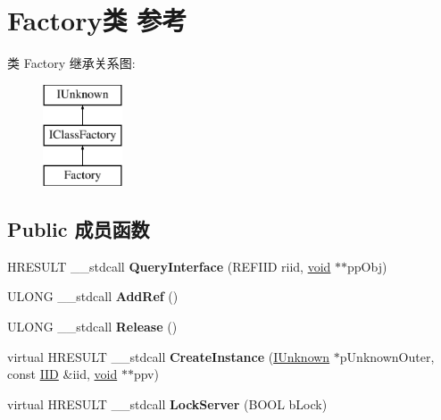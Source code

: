 \hypertarget{class_factory}{}\section{Factory类 参考}
\label{class_factory}
类 Factory 继承关系图\+:\begin{figure}[H]
\begin{center}
\leavevmode
\includegraphics[height=3.000000cm]{class_factory}
\end{center}
\end{figure}
\subsection*{Public 成员函数}
\begin{DoxyCompactItemize}
\item 
\mbox{\label{class_factory_a132826b7d9cfd08ceb73b3ae79027eee}} 
H\+R\+E\+S\+U\+LT \+\_\+\+\_\+stdcall {\bfseries Query\+Interface} (R\+E\+F\+I\+ID riid, \hyperlink{interfacevoid}{void} $\ast$$\ast$pp\+Obj)
\item 
\mbox{\label{class_factory_af89bb4550e9ac048f5c96f03cd5d4218}} 
U\+L\+O\+NG \+\_\+\+\_\+stdcall {\bfseries Add\+Ref} ()
\item 
\mbox{\label{class_factory_ac11f48570ae0a77bb49965536f341fa9}} 
U\+L\+O\+NG \+\_\+\+\_\+stdcall {\bfseries Release} ()
\item 
\mbox{\label{class_factory_afc50993f99999fbcd5573903e48b8df7}} 
virtual H\+R\+E\+S\+U\+LT \+\_\+\+\_\+stdcall {\bfseries Create\+Instance} (\hyperlink{interface_i_unknown}{I\+Unknown} $\ast$p\+Unknown\+Outer, const \hyperlink{struct___i_i_d}{I\+ID} \&iid, \hyperlink{interfacevoid}{void} $\ast$$\ast$ppv)
\item 
\mbox{\label{class_factory_a781e4f37ad49d6ca38ccfa262693b6e1}} 
virtual H\+R\+E\+S\+U\+LT \+\_\+\+\_\+stdcall {\bfseries Lock\+Server} (B\+O\+OL b\+Lock)
\end{DoxyCompactItemize}

